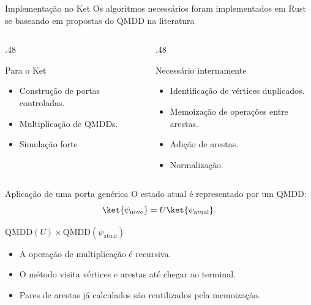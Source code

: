 \documentclass{beamer}
\begin{document}
\begin{frame}{Implementação no Ket}
  Os algoritmos necessários foram implementados em Rust se baseando em propostas do QMDD na literatura

  \begin{columns}[t]
    \begin{column}{.48\textwidth}
      \begin{block}{Para o Ket}
        \begin{itemize}
          \item Construção de portas controladas.
          \item Multiplicação de QMDDs.
          \item Simulação forte
        \end{itemize}
      \end{block}
    \end{column}
    \begin{column}{.48\textwidth}
      \begin{block}{Necessário internamente}
        \begin{itemize}
          \item Identificação de vértices duplicados.
          \item Memoização de operações entre arestas.
          \item Adição de arestas.
          \item Normalização.
        \end{itemize}
      \end{block}
    \end{column}
  \end{columns}
\end{frame}

\begin{frame}{Aplicação de uma porta genérica}
  O estado atual é representado por um QMDD:
  \[
    \ket{\psi_{\text{novo}}}=U\ket{\psi_{\text{atual}}}.
  \]

  \begin{center}
    $\mathrm{QMDD}(U)\times\mathrm{QMDD}(\psi_{\text{atual}})$
  \end{center}

  \begin{itemize}
    \item A operação de multiplicação é recursiva.
    \item O método visita vértices e arestas até chegar ao terminal.
    \item Pares de arestas já calculados são reutilizados pela memoização.
  \end{itemize}
\end{frame}
\end{document}

